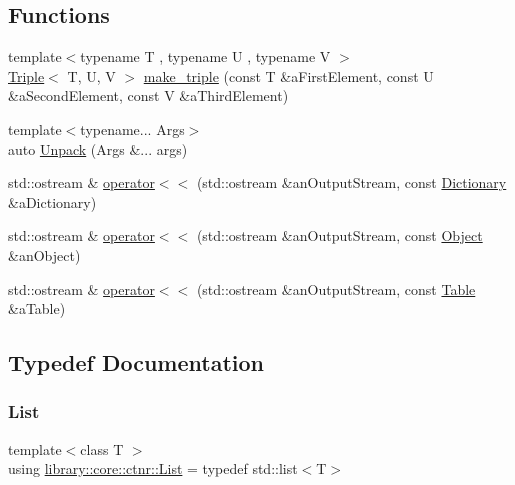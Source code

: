 \subsection*{Functions}
\begin{DoxyCompactItemize}
\item 
{\footnotesize template$<$typename T , typename U , typename V $>$ }\\\hyperlink{structlibrary_1_1core_1_1ctnr_1_1_triple}{Triple}$<$ T, U, V $>$ \hyperlink{namespacelibrary_1_1core_1_1ctnr_a96a0b941c0de59772cb5e073d0c2b8a8}{make\+\_\+triple} (const T \&a\+First\+Element, const U \&a\+Second\+Element, const V \&a\+Third\+Element)
\item 
{\footnotesize template$<$typename... Args$>$ }\\auto \hyperlink{namespacelibrary_1_1core_1_1ctnr_aa83e692c1420d325c7602ae7b21d626d}{Unpack} (Args \&... args)
\item 
std\+::ostream \& \hyperlink{namespacelibrary_1_1core_1_1ctnr_a5089e336819bf6e43bdb9ea9c8c01fcf}{operator$<$$<$} (std\+::ostream \&an\+Output\+Stream, const \hyperlink{classlibrary_1_1core_1_1ctnr_1_1_dictionary}{Dictionary} \&a\+Dictionary)
\item 
std\+::ostream \& \hyperlink{namespacelibrary_1_1core_1_1ctnr_a20ee48a4a564834bae30af868b549043}{operator$<$$<$} (std\+::ostream \&an\+Output\+Stream, const \hyperlink{classlibrary_1_1core_1_1ctnr_1_1_object}{Object} \&an\+Object)
\item 
std\+::ostream \& \hyperlink{namespacelibrary_1_1core_1_1ctnr_aae8e4f8665fde7fdd3e3f479e48c90aa}{operator$<$$<$} (std\+::ostream \&an\+Output\+Stream, const \hyperlink{classlibrary_1_1core_1_1ctnr_1_1_table}{Table} \&a\+Table)
\end{DoxyCompactItemize}


\subsection{Typedef Documentation}
\mbox{\label{namespacelibrary_1_1core_1_1ctnr_a87ccf40619002299b341a5e76e989912}} 
\subsubsection{\texorpdfstring{List}{List}}
{\footnotesize\ttfamily template$<$class T $>$ \\
using \hyperlink{namespacelibrary_1_1core_1_1ctnr_a87ccf40619002299b341a5e76e989912}{library\+::core\+::ctnr\+::\+List} = typedef std\+::list$<$T$>$}



